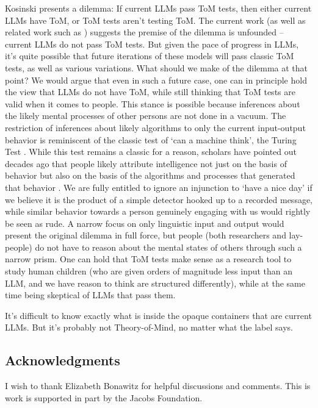 \documentclass{article}
\begin{document}
Kosinski \citep{kosinski2023theory} presents a dilemma: If current LLMs pass ToM tests, then either current LLMs have ToM, or ToM tests aren't testing ToM. The current work (as well as related work such as \citep{sap2022neural}) suggests the premise of the dilemma is unfounded -- current LLMs do not pass ToM tests. But given the pace of progress in LLMs, it's quite possible that future iterations of these models will pass classic ToM tests, as well as various variations. What should we make of the dilemma at that point? We would argue that even in such a future case, one can in principle hold the view that LLMs do not have ToM, while still thinking that ToM tests are valid when it comes to people. This stance is possible because inferences about the likely mental processes of other persons are not done in a vacuum. The restriction of inferences about likely algorithms to only the current input-output behavior is reminiscent of the classic test of `can a machine think', the Turing Test \citep{machinery1950computing}. While this test remains a classic for a reason, scholars have pointed out decades ago that people likely attribute intelligence not just on the basis of behavior but also on the basis of the algorithms and processes that generated that behavior \citep{block1981psychologism}. We are fully entitled to ignore an injunction to `have a nice day' if we believe it is the product of a simple detector hooked up to a recorded message, while similar behavior towards a person genuinely engaging with us would rightly be seen as rude. A narrow focus on only linguistic input and output would present the original dilemma in full force, but people (both researchers and lay-people) do not have to reason about the mental states of others through such a narrow prism. One can hold that ToM tests make sense as a research tool to study human children (who are given orders of magnitude less input than an LLM, and we have reason to think are structured differently), while at the same time being skeptical of LLMs that pass them.   

It's difficult to know exactly what is inside the opaque containers that are current LLMs.  But it's probably not Theory-of-Mind, no matter what the label says. 

\subsection*{Acknowledgments}

I wish to thank Elizabeth Bonawitz for helpful discussions and comments. This is work is supported in part by the Jacobs Foundation. 



\end{document}
